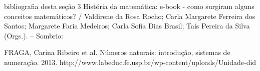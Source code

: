 bibliografia desta seção
3 História da matemática: e-book - como surgiram
alguns conceitos matemáticos? / Valdirene da Rosa
Rocho; Carla Margarete Ferreira dos Santos;
Margarete Faria Medeiros; Carla Sofia Dias Brasil;
Taís Pereira da Silva (Orgs.). -- Sombrio:

FRAGA, Carina Ribeiro et al. Números naturais: introdução, sistemas de numeração. 2013.
http://www.labeduc.fe.usp.br/wp-content/uploads/Unidade-did%